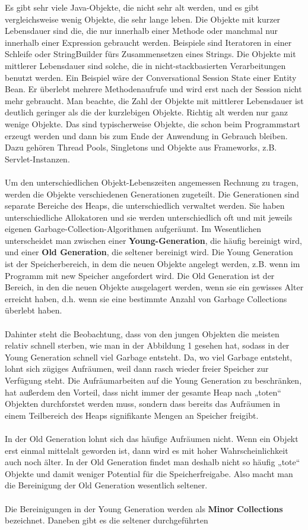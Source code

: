 \documentclass[a4paper,14pt]{scrreprt}
\begin{document}
Es gibt sehr viele Java-Objekte, die nicht sehr alt werden, und es gibt vergleichsweise wenig Objekte, die sehr lange leben.  Die Objekte mit kurzer Lebensdauer sind die, die nur innerhalb einer Methode oder manchmal nur innerhalb einer Expression gebraucht werden. Beispiele sind Iteratoren in einer Schleife oder StringBuilder fürs Zusammensetzen eines Strings. Die Objekte mit mittlerer Lebensdauer sind solche, die in nicht-stackbasierten Verarbeitungen benutzt werden. Ein Beispiel wäre der Conversational Session State einer Entity Bean. Er überlebt mehrere Methodenaufrufe und wird erst nach der Session nicht mehr gebraucht. Man beachte, die Zahl der Objekte mit mittlerer Lebensdauer ist deutlich geringer als die der kurzlebigen Objekte. Richtig alt werden nur ganz wenige Objekte. Das sind typischerweise Objekte, die schon beim Programmstart erzeugt werden und dann bis zum Ende der Anwendung in Gebrauch bleiben. Dazu gehören Thread Pools, Singletons und Objekte aus Frameworks, z.B. Servlet-Instanzen.\\\\Um den unterschiedlichen Objekt-Lebenszeiten angemessen Rechnung zu tragen, werden die Objekte verschiedenen Generationen zugeteilt. Die Generationen sind separate Bereiche des Heaps, die unterschiedlich verwaltet werden. Sie haben unterschiedliche Allokatoren und sie werden unterschiedlich oft und mit jeweils eigenen Garbage-Collection-Algorithmen aufgeräumt. Im Wesentlichen unterscheidet man zwischen einer \textbf{Young-Generation}, die häufig bereinigt wird, und einer \textbf{Old Generation}, die seltener bereinigt wird. Die Young Generation ist der Speicherbereich, in dem die neuen Objekte angelegt werden, z.B. wenn im Programm mit new Speicher angefordert wird.  Die Old Generation ist der Bereich, in den die neuen Objekte ausgelagert werden, wenn sie ein gewisses Alter erreicht haben, d.h. wenn sie eine bestimmte Anzahl von Garbage Collections überlebt haben.\\\\Dahinter steht die Beobachtung, dass von den jungen Objekten die meisten relativ schnell sterben, wie man in der Abbildung 1 gesehen hat, sodass in der Young Generation schnell viel Garbage entsteht. Da, wo viel Garbage entsteht, lohnt sich zügiges Aufräumen, weil dann rasch wieder freier Speicher zur Verfügung steht. Die Aufräumarbeiten auf die Young Generation zu beschränken, hat außerdem den Vorteil, dass nicht immer der gesamte Heap nach „toten“ Objekten durchforstet werden muss, sondern dass bereits das Aufräumen in einem Teilbereich des Heaps signifikante Mengen an Speicher freigibt.\\\\In der Old Generation lohnt sich das häufige Aufräumen nicht.  Wenn ein Objekt erst einmal mittelalt geworden ist, dann wird es mit hoher Wahrscheinlichkeit auch noch älter. In der Old Generation findet man deshalb nicht so häufig „tote“ Objekte und damit weniger Potential für die Speicherfreigabe. Also macht man die Bereinigung der Old Generation wesentlich seltener.\\\\Die Bereinigungen in der Young Generation werden als \textbf{Minor Collections} bezeichnet. Daneben gibt es die seltener durchgeführten 
\end{document}
